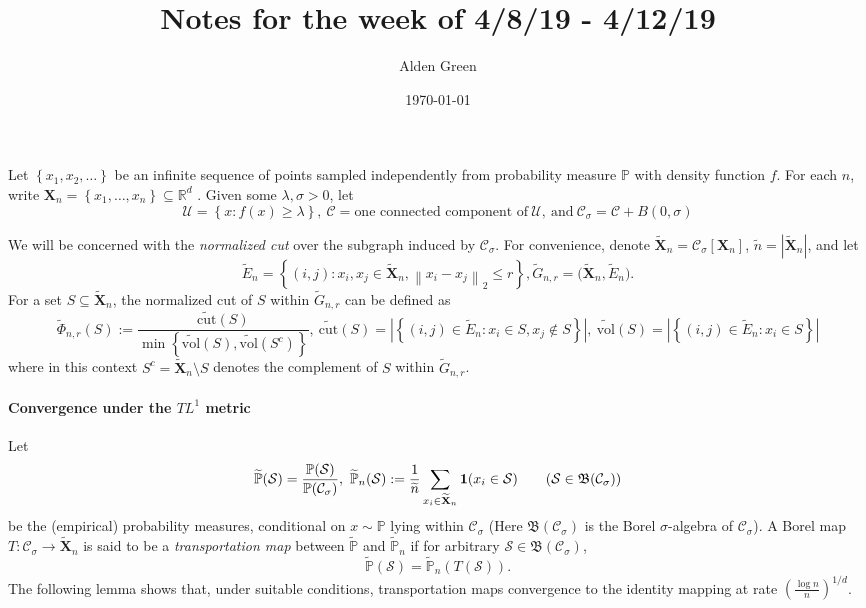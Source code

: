 \documentclass{article}
\newcommand{\Reals}{\mathbb{R}}
\newcommand{\norm}[1]{\left\lVert#1\right\rVert}
\newcommand{\abs}[1]{\left \lvert #1 \right \rvert}
\newcommand{\set}[1]{\left\{#1\right\}}
\newcommand{\Xbf}{\mathbf{X}}
\newcommand{\Cset}{\mathcal{C}}
\newcommand{\Sset}{\mathcal{S}}
\newcommand{\Csig}{\Cset_{\sigma}}
\newcommand{\Pbb}{\mathbb{P}}
\newcommand{\1}{\mathbf{1}}
\newcommand{\cut}{\mathrm{cut}}
\newcommand{\vol}{\mathrm{vol}}
\theoremstyle{alden}
\theoremstyle{aldenthm}
\theoremstyle{remark}
\begin{document}
	
\title{Notes for the week of 4/8/19 - 4/12/19}
\author{Alden Green}
\date{\today}
\maketitle

Let $\set{x_1, x_2, \ldots}$ be an infinite sequence of points sampled independently from probability measure $\Pbb$ with density function $f$. For each $n$, write $\Xbf_n = \set{x_1, \ldots, x_n} \subseteq \Reals^d$ . Given some $\lambda, \sigma > 0$, let
\begin{equation*}
\mathcal{U} = \set{x: f(x) \geq \lambda},~ \mathcal{C} = \textrm{one connected component of}~ \mathcal{U}, ~\textrm{and}~ \Csig = \Cset + B(0,\sigma)
\end{equation*}

We will be concerned with the \emph{normalized cut} over the subgraph induced by $\Csig$. For convenience, denote $\widetilde{\Xbf}_n = \Csig[\Xbf_n]$, $\widetilde{n} = \abs{\widetilde{\Xbf}_n}$, and let
\begin{equation*}
\widetilde{E}_n = \set{(i,j): x_i, x_j \in \widetilde{\Xbf}_n, \norm{x_i - x_j}_2 \leq r}, \widetilde{G}_{n,r} = \bigl(\widetilde{\Xbf}_n, \widetilde{E}_n \bigr).
\end{equation*}
For a set $S \subseteq \widetilde{\Xbf}_n$, the normalized cut of $S$ within $\widetilde{G}_{n,r}$ can be defined as
\begin{equation*}
\widetilde{\Phi}_{n,r}(S) := \frac{\widetilde{\cut}(S)}{\min \set{\widetilde{\vol}(S), \widetilde{\vol}(S^c)}},~ \widetilde{\cut}(S) = \abs{ \set{(i,j) \in \widetilde{E}_n: x_i \in S, x_j \not\in S}},~ \widetilde{\vol}(S) = \abs{ \set{(i,j) \in \widetilde{E}_n: x_i \in S} }
\end{equation*}
where in this context $S^c = \widetilde{\Xbf}_n \setminus S$ denotes the complement of $S$ within $\widetilde{G}_{n,r}$. 

\paragraph{Convergence under the $TL^1$ metric}

Let
\begin{equation*}
\widetilde{\Pbb}(\Sset) = \frac{\Pbb(\Sset)}{\Pbb(\Csig)}, ~ \widetilde{\Pbb}_{n}(\Sset) := \frac{1}{\widetilde{n}} \sum_{x_i \in \widetilde{\Xbf}_n} \1(x_i \in \Sset) \tag{$\Sset \in \mathfrak{B}(\Csig)$}
\end{equation*} 
be the (empirical) probability measures, conditional on $x \sim \Pbb$ lying within $\Csig$ (Here $\mathfrak{B}(\Csig)$ is the Borel $\sigma$-algebra of $\Csig$). A Borel map $T: \Csig \to \widetilde{\Xbf}_n$ is said to be a \emph{transportation map} between $\widetilde{\Pbb}$ and $\widetilde{\Pbb}_n$ if for arbitrary $\Sset \in \mathfrak{B}(\Csig)$,  
\begin{equation*}
\widetilde{\Pbb}(\Sset) = \widetilde{\Pbb}_n(T(\Sset)).
\end{equation*}
The following lemma shows that, under suitable conditions, transportation maps convergence to the identity mapping at rate $\left(\frac{\log n}{n}\right)^{1/d}$. 
\end{document}
